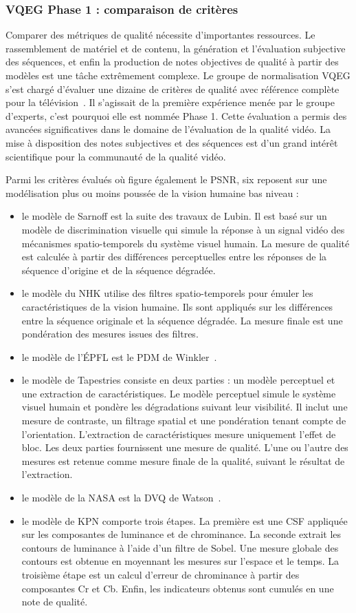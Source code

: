\subsubsection{VQEG Phase 1 : comparaison de critères}
Comparer des métriques de qualité nécessite d'importantes ressources. Le rassemblement de matériel et de contenu, la génération et l'évaluation subjective des séquences, et enfin la production de notes objectives de qualité à partir des modèles est une tâche extrêmement complexe. Le groupe de normalisation VQEG s'est chargé d'évaluer une dizaine de critères de qualité avec référence complète pour la télévision~\cite{vqeg-frtv1}. Il s'agissait de la première expérience menée par le groupe d'experts, c'est pourquoi elle est nommée Phase 1. Cette évaluation a permis des avancées significatives dans le domaine de l'évaluation de la qualité vidéo. La mise à disposition des notes subjectives et des séquences est d'un grand intérêt scientifique pour la communauté de la qualité vidéo.

Parmi les critères évalués où figure également le PSNR, six reposent sur une modélisation plus ou moins poussée de la vision humaine bas niveau :
\begin{itemize}
\item le modèle de Sarnoff est la suite des travaux de Lubin. Il est basé sur un modèle de discrimination visuelle qui simule la réponse à un signal vidéo des mécanismes spatio-temporels du système visuel humain. La mesure de qualité est calculée à partir des différences perceptuelles entre les réponses de la séquence d'origine et de la séquence dégradée.
\item le modèle du NHK utilise des filtres spatio-temporels pour émuler les caractéristiques de la vision humaine. Ils sont appliqués sur les différences entre la séquence originale et la séquence dégradée. La mesure finale est une pondération des mesures issues des filtres.
\item le modèle de l'ÉPFL est le PDM de Winkler~\cite{winkler-hvei1999}.
\item le modèle de Tapestries consiste en deux parties : un modèle perceptuel et une extraction de caractéristiques. Le modèle perceptuel simule le système visuel humain et pondère les dégradations suivant leur visibilité. Il inclut une mesure de contraste, un filtrage spatial et une pondération tenant compte de l'orientation. L'extraction de caractéristiques mesure uniquement l'effet de bloc. Les deux parties fournissent une mesure de qualité. L'une ou l'autre des mesures est retenue comme mesure finale de la qualité, suivant le résultat de l'extraction.
\item le modèle de la NASA est la DVQ de Watson~\cite{watson-dvq}.
\item le modèle de KPN comporte trois étapes. La première est une CSF appliquée sur les composantes de luminance et de chrominance. La seconde extrait les contours de luminance à l'aide d'un filtre de Sobel. Une mesure globale des contours est obtenue en moyennant les mesures sur l'espace et le temps. La troisième étape est un calcul d'erreur de chrominance à partir des composantes Cr et Cb. Enfin, les indicateurs obtenus sont cumulés en une note de qualité.
\end{itemize}

